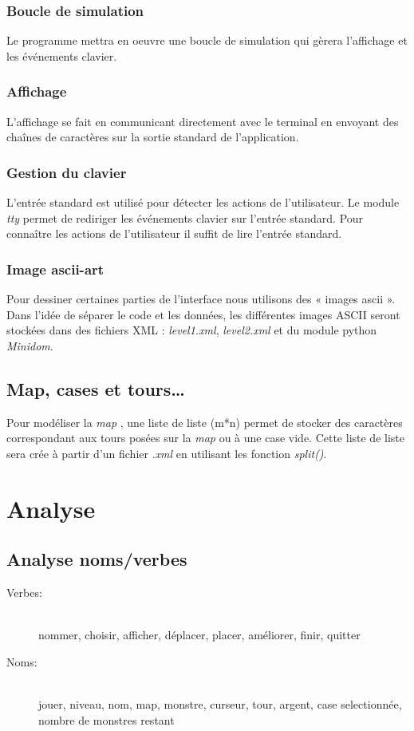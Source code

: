 \documentclass[a4paper]{article}
\begin{document}
            \subsubsection{Boucle de simulation}
            Le programme mettra en oeuvre une boucle de simulation qui gèrera l'affichage et les
            événements clavier.

            \subsubsection{Affichage}
            L'affichage se fait en communicant directement avec le terminal en envoyant des chaînes de
            caractères sur la sortie standard de l'application.

            \subsubsection{Gestion du clavier}
            L'entrée standard est utilisé pour détecter les actions de l'utilisateur.
            Le module \emph{tty} permet de rediriger les événements clavier sur l'entrée standard.
            Pour connaître les actions de l'utilisateur il suffit de lire l'entrée standard.

            \subsubsection{Image ascii-art}
            Pour dessiner certaines parties de l'interface nous utilisons des « images ascii ».
            Dans l'idée de séparer le code et les données, les différentes images ASCII seront stockées dans des fichiers XML : \emph{level1.xml}, \emph{level2.xml} et du module python \emph{Minidom}.

        \subsection{Map, cases et tours\ldots}
        Pour modéliser la \emph{map} , une liste de liste (m*n) permet de stocker des caractères correspondant aux tours posées sur la \emph{map} ou à une case vide.
        Cette liste de liste sera crée à partir d'un fichier .\emph{xml} en utilisant les fonction \emph{split()}.
    
    \section{Analyse}
        \subsection{Analyse noms/verbes}
            \begin{description}
                \item[Verbes:] \hfill \\
                    nommer, choisir, afficher, déplacer, placer, améliorer, finir, quitter
                \item[Noms:] \hfill \\
                    jouer, niveau, nom, map, monstre, curseur, tour, argent, case selectionnée, nombre de monstres restant
           \end{description}
\end{document}
